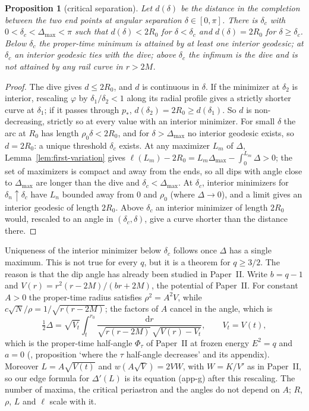 \documentclass[aip,jmp,amsmath,amssymb,reprint]{revtex4-2}
\newcommand{\dd}{\mathrm{d}}
\theoremstyle{plain}
\newtheorem{proposition}{Proposition}[section]
\theoremstyle{definition}
\begin{document}
\begin{proposition}[critical separation]\label{prop:critical}
Let $d(\delta)$ be the distance in the completion between the two end points at angular
separation $\delta\in[0,\pi]$. There is $\delta_c$ with $0<\delta_c<\Delta_{\max}<\pi$ such that
$d(\delta)<2R_0$ for $\delta<\delta_c$ and $d(\delta)=2R_0$ for $\delta\ge\delta_c$. Below $\delta_c$ the
proper-time minimum is attained by at least one interior geodesic; at $\delta_c$ an interior
geodesic ties with the dive; above $\delta_c$ the infimum is the dive and is not attained by any
rail curve in $r>2M$.
\end{proposition}

\begin{proof}
The dive gives $d\le2R_0$, and $d$ is continuous in $\delta$. If the minimizer at $\delta_2$ is
interior, rescaling $\varphi$ by $\delta_1/\delta_2<1$ along its radial profile gives a strictly
shorter curve at $\delta_1$; if it passes through $p_*$, $d(\delta_2)=2R_0\ge d(\delta_1)$. So $d$ is
non-decreasing, strictly so at every value with an interior minimizer. For small $\delta$ the arc
at $R_0$ has length $\rho_0\delta<2R_0$, and for $\delta>\Delta_{\max}$ no interior geodesic exists, so
$d=2R_0$: a unique threshold $\delta_c$ exists. At any maximizer $L_m$ of $\Delta$,
Lemma~\ref{lem:first-variation} gives $\ell(L_m)-2R_0=L_m\Delta_{\max}-\int_0^{L_m}\Delta>0$; the set
of maximizers is compact and away from the ends, so all dips with angle close to $\Delta_{\max}$
are longer than the dive and $\delta_c<\Delta_{\max}$. At $\delta_c$, interior minimizers for
$\delta_n\uparrow\delta_c$ have $L_n$ bounded away from $0$ and $\rho_0$ (where $\Delta\to0$), and a limit
gives an interior geodesic of length $2R_0$. Above $\delta_c$ an interior minimizer of length
$2R_0$ would, rescaled to an angle in $(\delta_c,\delta)$, give a curve shorter than the distance
there.
\end{proof}

Uniqueness of the interior minimizer below $\delta_c$ follows once $\Delta$ has a single
maximum. This is not true for every $q$, but it is a theorem for $q\ge3/2$. The reason is
that the dip angle has already been studied in Paper~II. Write $b=q-1$ and
$V(r)=r^2(r-2M)/(br+2M)$, the potential of Paper~II. For constant $A>0$ the proper-time
radius satisfies $\rho^2=A^2V$, while $c\sqrt N/\rho=1/\sqrt{r(r-2M)}$; the factors of $A$
cancel in the angle, which is
\[
  \tfrac12\Delta=\sqrt{V_t}\int_t^{r_0}\frac{\dd r}{\sqrt{r(r-2M)}\,\sqrt{V(r)-V_t}},\qquad V_t=V(t),
\]
which is the proper-time half-angle $\Phi_\tau$ of Paper~II at frozen energy $E^2=q$ and
$a=0$ (\cite{PaperTwo}, proposition `where the $\tau$ half-angle decreases' and its appendix).
Moreover $L=A\sqrt{V(t)}$ and $w(A\sqrt V)=2VW$, with $W=K/V'$ as in Paper~II, so our edge
formula for $\Delta'(L)$ is its equation (app-g) after this rescaling. The number of maxima,
the critical periastron and the angles do not depend on $A$; $R$, $\rho$, $L$ and $\ell$ scale
with it.
\end{document}
